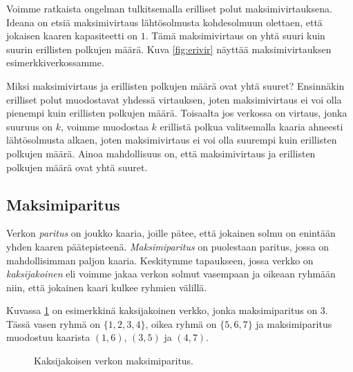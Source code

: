 Voimme ratkaista ongelman
tulkitsemalla erilliset polut maksimivirtauksena.
Ideana on etsiä maksimivirtaus lähtösolmusta kohdesolmuun
olettaen, että jokaisen kaaren kapasiteetti on $1$.
Tämä maksimivirtaus on yhtä suuri kuin suurin
erillisten polkujen määrä.
Kuva \ref{fig:erivir} näyttää maksimivirtauksen
esimerkkiverkossamme.

Miksi maksimivirtaus ja erillisten polkujen määrä ovat yhtä suuret?
Ensinnäkin erilliset polut muodostavat yhdessä virtauksen,
joten maksimivirtaus ei voi olla pienempi kuin erillisten polkujen määrä.
Toisaalta jos verkossa on virtaus, jonka suuruus on $k$,
voimme muodostaa $k$ erillistä polkua
valitsemalla kaaria ahneesti lähtösolmusta alkaen,
joten maksimivirtaus ei voi olla suurempi kuin erillisten polkujen määrä.
Ainoa mahdollisuus on, että maksimivirtaus ja erillisten polkujen määrä
ovat yhtä suuret.

\subsection{Maksimiparitus}

Verkon \emph{paritus} on joukko kaaria, joille pätee,
että jokainen solmu on enintään yhden kaaren päätepisteenä.
\emph{Maksimiparitus} on puolestaan paritus,
jossa on mahdollisimman paljon kaaria.
Keskitymme tapaukseen,
jossa verkko on \emph{kaksijakoinen} eli
voimme jakaa verkon solmut
vasempaan ja oikeaan ryhmään niin, että jokainen
kaari kulkee ryhmien välillä.

Kuvassa \ref{fig:makpar} on esimerkkinä kaksijakoinen verkko,
jonka maksimiparitus on $3$.
Tässä vasen ryhmä on $\{1,2,3,4\}$, oikea ryhmä on $\{5,6,7\}$
ja maksimiparitus muodostuu kaarista
$(1,6)$, $(3,5)$ ja $(4,7)$.

\begin{figure}
\center
\begin{center}
\end{center}
\caption{Kaksijakoisen verkon maksimiparitus.}
\label{fig:makpar}
\end{figure}

